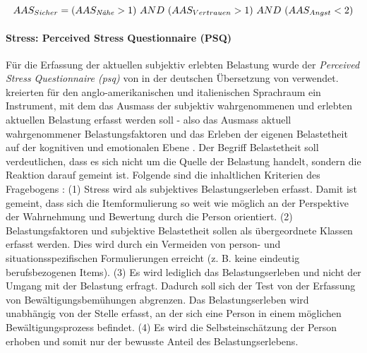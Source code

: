 \begin{equation}\label{eq:AASSicherVsUnsicher}
    AAS_{Sicher}=( AAS_{\text{\textit{N{\"a}he}}} > 1) ~AND~ (AAS_{Vertrauen} > 1) ~AND~ (AAS_{Angst} < 2)
\end{equation}

\paragraph{Stress: Perceived Stress Questionnaire (PSQ)}\label{sec:PSQ}
Für die Erfassung der aktuellen subjektiv erlebten Belastung wurde der \textit{Perceived Stress Questionnaire (\acrshort{psq})} von  in der deutschen Übersetzung von  verwendet.
 kreierten für den anglo-amerikanischen und italienischen Sprachraum ein Instrument, mit dem das Ausmass der subjektiv wahrgenommenen und erlebten aktuellen Belastung erfasst werden soll - also das Ausmass aktuell wahrgenommener Belastungsfaktoren und das Erleben der eigenen Belastetheit auf der kognitiven und emotionalen Ebene \cite{Fliege2001}. Der Begriff Belastetheit soll verdeutlichen, dass es sich nicht um die Quelle der Belastung handelt, sondern die Reaktion darauf gemeint ist. Folgende sind die inhaltlichen Kriterien des Fragebogens \cite{Fliege2001}: (1) Stress wird als subjektives Belastungserleben erfasst. Damit ist gemeint, dass sich die Itemformulierung so weit wie möglich an der Perspektive der Wahrnehmung und Bewertung durch die Person orientiert. (2) Belastungsfaktoren und subjektive Belastetheit sollen als übergeordnete Klassen erfasst werden. Dies wird durch ein Vermeiden von person- und situationsspezifischen Formulierungen erreicht (z. B. keine eindeutig berufsbezogenen Items). (3) Es wird lediglich das Belastungserleben und nicht der Umgang mit der Belastung erfragt. Dadurch soll sich der Test von der Erfassung von Bewältigungsbemühungen abgrenzen. Das Belastungserleben wird unabhängig von der Stelle erfasst, an der sich eine Person in einem möglichen Bewältigungsprozess befindet. (4) Es wird die Selbsteinschätzung der Person erhoben und somit nur der bewusste Anteil des Belastungserlebens.

